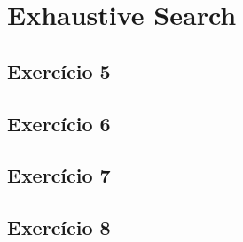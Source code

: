 
\section{Exhaustive Search}\label{sec:exhaustive_force}

\subsection{Exercício 5}\label{sec:exer5}

\subsection{Exercício 6}\label{sec:exer6}

\subsection{Exercício 7}\label{sec:exer7}

\subsection{Exercício 8}\label{sec:exer8}
